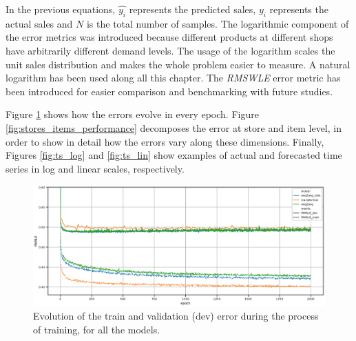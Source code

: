 In the previous equations, $\hat{y_i}$ represents the predicted sales,  $y_i$ represents the actual sales and $N$ is the total number of samples. The logarithmic component of the error metrics was introduced because different products at different shops have arbitrarily different demand levels. The usage of the logarithm scales the unit sales distribution and makes the whole problem easier to measure. A natural logarithm has been used along all this chapter. The \textit{RMSWLE} error metric has been introduced for easier comparison and benchmarking with future studies.

Figure \ref{fig:performance_evolution} shows how the errors evolve in every epoch. Figure \ref{fig:stores_items_performance} decomposes the error at store and item level, in order to show in detail how the errors vary along these dimensions. Finally, Figures \ref{fig:ts_log} and \ref{fig:ts_lin} show examples of actual and forecasted time series in log and linear scales, respectively.

\begin{figure}[h!]
	\centering
	\includegraphics[width=1\linewidth]{salesforecast/images/evolution}
	\caption[Evolution of the train and validation errors]{Evolution of the train and validation (dev) error during the process of training, for all the models.}
	\label{fig:performance_evolution}
\end{figure}

